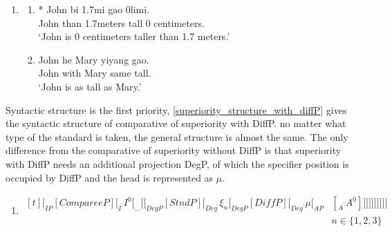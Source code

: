 \documentclass{ctexart}
\begin{document}
\begin{enumerate}
    \item \label{superiority_example_9}
    \begin{enumerate}
        \item \label{superiority_example_9_a}
        * John bi 1.7mi gao 0limi. \\
        \hspace*{0.5em} John than 1.7meters tall 0 centimeters. \\
        \hspace*{0.5em} `John is 0 centimeters taller than 1.7 meters.'

        \item \label{superiority_example_9_b}
        John he Mary yiyang gao. \\
        John with Mary same tall.  \\
        `John is as tall as Mary.'

    \end{enumerate}
\end{enumerate}

Syntactic structure is the first priority, \ref{superiority_structure_with_diffP} gives the syntactic structure of comparative of superiority with DiffP. no matter what type of the standard is taken, the general structure is almost the same. The only difference from the comparative of superiority without DiffP is that superiority with DiffP needs an additional projection DegP, of which the specifier position is occupied by DiffP and the head is represented as $\mu$.

\begin{enumerate}
    \item \label{superiority_structure_with_diffP}
    $\begin{aligned}[t]
        [_{IP} [CompareeP] [_{I^{\prime}} I^{0} [_{...} [[_{DegP} [StndP] [_{Deg^{\prime}} \xi_{n} [_{DegP} [DiffP] [_{Deg^{\prime}} \mu [_{AP} & [_{A^{\prime}} A^{0}]]]]]]]]]] \\
        & n \in \{1, 2, 3\}
    \end{aligned}$
\end{enumerate}
\end{document}
